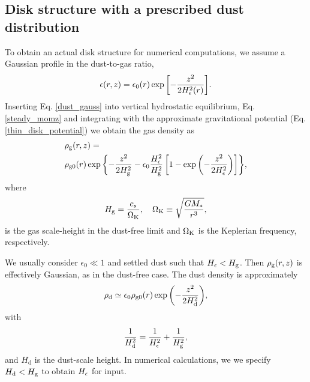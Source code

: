 \subsection{Disk structure with a prescribed dust distribution}\label{steady_state}  
To obtain an actual disk structure for numerical computations, we
assume a Gaussian profile in the dust-to-gas ratio,   
\begin{align}\label{dust_gauss}
  \epsilon(r,z) = \epsilon_0(r)
  \exp{\left[-\frac{z^2}{2H_\epsilon^2(r)}\right]}. 
\end{align}
Inserting Eq. \ref{dust_gauss} into vertical hydrostatic equilibrium,
Eq. \ref{steady_momz} and integrating with the approximate
gravitational potential (Eq. \ref{thin_disk_potential}) we obtain the
gas density as
\begin{align}
  &\rho_\mathrm{g}(r,z)= \notag\\
&\rho_\mathrm{g0}(r)\exp{\left\{ - \frac{z^2}{2H_\mathrm{g}^2}
    -\epsilon_0\frac{H_\epsilon^2}{H_\mathrm{g}^2}\left[1 -
      \exp{\left(-\frac{z^2}{2H_\epsilon^2}\right)}\right] \right\}}, 
\end{align}
where
\begin{align}
  H_\mathrm{g} = \frac{c_s}{\Omega_{\rm K}}, \quad \Omega_{\rm K} \equiv \sqrt{\frac{GM_*}{r^3}},   
\end{align}
is the gas scale-height in the dust-free limit and $\Omega_{\rm K}$ is the
Keplerian frequency, respectively. 

We usually consider $\epsilon_0 \ll 1$ and settled dust such that
$H_\epsilon<H_\mathrm{g}$. Then $\rho_\mathrm{g}(r,z)$ is effectively Gaussian, as in the
dust-free case. The dust density is approximately 
\begin{align}
  \rho_\mathrm{d} \simeq \epsilon_0\rho_\mathrm{g0}(r) \exp
        {\left(-\frac{z^2}{2H_\mathrm{d}^2}\right)}, 
\end{align}
with 
\begin{align}
  \frac{1}{H_\mathrm{d}^2} = \frac{1}{H_\epsilon^2} + \frac{1}{H_\mathrm{g}^2}, 
\end{align}
and $H_\mathrm{d}$ is the dust-scale height. In numerical
calculations, we  we specify $H_\mathrm{d}< H_\mathrm{g}$ to obtain 
$H_\epsilon$ for input. 

